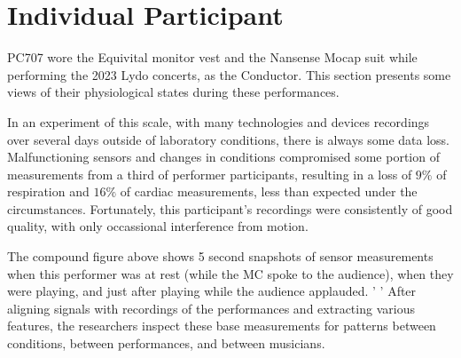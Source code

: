 \section*{Individual Participant}
 PC707 wore the Equivital monitor vest and the Nansense Mocap suit while performing the 2023 Lydo concerts,  as the Conductor. This section presents some views of their physiological states during these performances.

In an experiment of this scale, with many technologies and devices recordings over several days outside of laboratory conditions, there is always some data loss.  Malfunctioning sensors and changes in conditions compromised some portion of measurements from a third of performer participants, resulting in a loss of $9\%$ of respiration and $16\%$ of cardiac measurements, less than expected under the circumstances.  Fortunately, this participant’s recordings were consistently of good quality, with only occassional interference from motion.


The compound figure above shows 5 second snapshots of sensor measurements when this performer was at rest (while the MC spoke to the audience), when they were playing, and just after playing while the audience applauded. ' ' After aligning signals with recordings of the performances and extracting various features, the researchers inspect these base measurements for patterns between conditions, between performances, and between musicians. 

